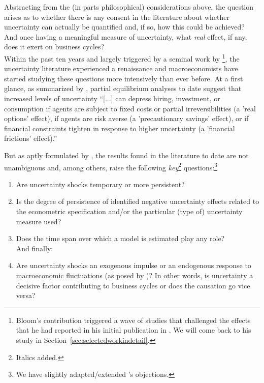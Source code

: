 \documentclass[a4paper,11pt,listof=nochaptergap,oneside,pointednumbers,bibtotoc,bigheadings,liststotoc,hidelinks]{scrbook}
\theoremstyle{mysatz}
\theoremstyle{mydefinition}
\theoremstyle{mytheorem}
\theoremstyle{mybemerkung}
\begin{document}
Abstracting from the (in parts philosophical) considerations above, the question arises as to whether there is any consent in the literature about whether uncertainty can actually be quantified and, if so, how this could be achieved? And once having a meaningful measure of uncertainty, what \textit{real} effect, if any, does it exert on business cycles?\\

Within the past ten years and largely triggered by a seminal work by \citet{bloom:09}\footnote{Bloom's contribution triggered a wave of studies that challenged the effects that he had reported in his initial publication in \citet{bloom:09}. We will come back to his study in Section~\ref{sec:selectedworkindetail}.}, the uncertainty literature experienced a renaissance and macroeconomists have started studying these questions more intensively than ever before. At a first glance, as summarized by \citet[p. 1177]{juradoetal:15}, partial equilibrium analyses to date suggest that increased levels of uncertainty ``[...] can depress hiring, investment, or consumption if agents are subject to fixed costs or partial irreversibilities (a 'real options' effect), if agents are risk averse (a 'precautionary savings' effect), or if financial constraints tighten in response to higher uncertainty (a 'financial frictions' effect).''

But as aptly formulated by \citet[p. 24]{bontempietal:16}, the results found in the literature to date are not unambiguous and, among others, raise the following \textit{key}\footnote{Italics added.} questions:\footnote{We have slightly adapted/extended \citet{bontempietal:16}'s objections.}
\begin{enumerate}
	\item Are uncertainty shocks temporary or more persistent?
	\item Is the degree of persistence of identified negative uncertainty effects related to the econometric specification and/or the particular (type of) uncertainty measure used? 
	\item Does the time span over which a model is estimated play any role? \\
	And finally:
	\item Are uncertainty shocks an exogenous impulse or an endogenous response to macroeconomic fluctuations (as posed by \citealp{ludvigsonetal:19})? In other words, is uncertainty a decisive factor contributing to business cycles or does the causation go vice versa?
\end{enumerate}
\end{document}
